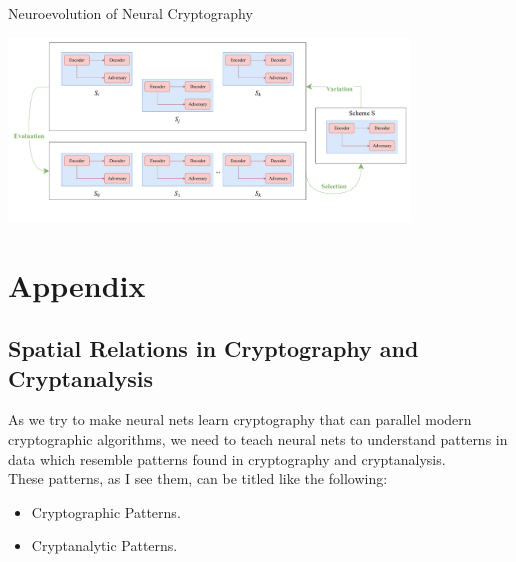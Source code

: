 \documentclass[a4paper, 12pt]{report}
\begin{document}
\begin{blockfigure}{Neuroevolution of Neural Cryptography}
	\begin{center}
		\includegraphics[width = 0.8\textwidth]{GAC}
	\end{center}
\end{blockfigure}
\newpage
\chapter*{Appendix}
\section*{\textbf{Spatial Relations in Cryptography and Cryptanalysis}}\label{appendix:1}
As we try to make neural nets learn cryptography that can parallel modern cryptographic algorithms, we need to teach neural nets to understand patterns in data which resemble patterns found in cryptography and cryptanalysis.\\
These patterns, as I see them, can be titled like the following:
\begin{itemize}
	\item Cryptographic Patterns.
	\item Cryptanalytic Patterns.
\end{itemize}
\end{document}
